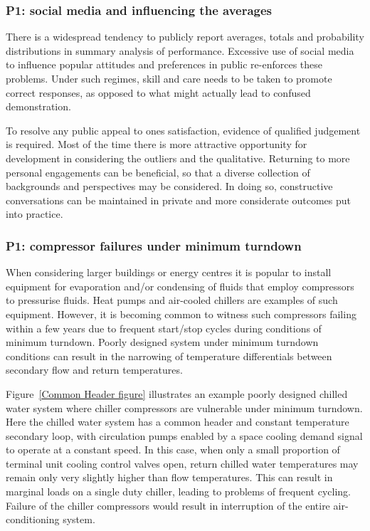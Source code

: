 \documentclass[11pt, oneside]{article}   	%
\begin{document}
\subsubsection{P1: social media and influencing the averages}
There is a widespread tendency to publicly report averages, totals and probability distributions in summary analysis of performance.
Excessive use of social media to influence popular attitudes and preferences in public re-enforces these problems.
Under such regimes, skill and care needs to be taken to promote correct responses, as opposed to what might actually lead to confused demonstration.\

To resolve any public appeal to ones satisfaction, evidence of qualified judgement is required.
Most of the time there is more attractive opportunity for development in considering the outliers and the qualitative.
Returning to more personal engagements can be beneficial, so that a diverse collection of backgrounds and perspectives may be considered.
In doing so, constructive conversations can be maintained in private and more considerate outcomes put into practice.\

\subsubsection{P1: compressor failures under minimum turndown}
When considering larger buildings or energy centres it is popular to install equipment for evaporation and/or condensing of fluids that employ compressors to pressurise fluids.
Heat pumps and air-cooled chillers are examples of such equipment.
However, it is becoming common to witness such compressors failing within a few years due to frequent start/stop cycles during conditions of minimum turndown.
Poorly designed system under minimum turndown conditions can result in the narrowing of temperature differentials between secondary flow and return temperatures.

Figure~\ref{Common Header figure} illustrates an example poorly designed chilled water system where chiller compressors are vulnerable under minimum turndown.
Here the chilled water system has a common header and constant temperature secondary loop, with circulation pumps enabled by a space cooling demand signal to operate at a constant speed.
In this case, when only a small proportion of terminal unit cooling control valves open, return chilled water temperatures may remain only very slightly higher than flow temperatures.
This can result in marginal loads on a single duty chiller, leading to problems of frequent cycling.
Failure of the chiller compressors would result in interruption of the entire air-conditioning system.\
\end{document}
